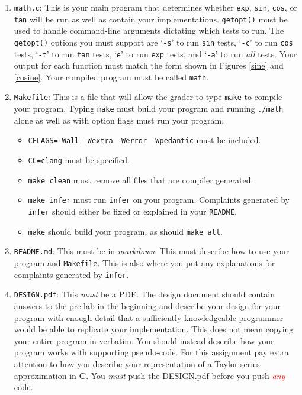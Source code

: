 \documentclass[11pt]{article}
\begin{document}
\begin{enumerate}
  \item \texttt{math.c}: This is your main program that determines whether
      \texttt{exp}, \texttt{sin}, \texttt{cos}, or \texttt{tan} will be run as
      well as contain your implementations. \texttt{getopt()} must be used to
      handle command-line arguments dictating which tests to run.
        The \texttt{getopt()} options you must support are
        `\texttt{-s}' to run \texttt{sin} tests, `\texttt{-c}' to run
        \texttt{cos} tests, `\texttt{-t}' to run \texttt{tan} tests,
        `\texttt{e}' to run \texttt{exp} tests, and `\texttt{-a}' to run
        \emph{all} tests. Your output for each function must match the form
        shown in Figures \ref{sine} and \ref{cosine}.
        Your compiled program must be called \texttt{math}.

  \item \texttt{Makefile}: This is a file that will allow the grader to type
      \texttt{make} to compile your program. Typing \texttt{make} must build
        your program and running \texttt{./math} alone as well as with option flags must run your program.
  \begin{itemize}
    \item \texttt{CFLAGS=-Wall -Wextra -Werror -Wpedantic} must be included.
    \item \texttt{CC=clang} must be specified.
    \item \texttt{make clean} must remove all files that are compiler generated.
    \item \texttt{make infer} must run \texttt{infer} on your program.
        Complaints generated by \texttt{infer} should either be fixed or
        explained in your \texttt{README}.
    \item \texttt{make} should build your program, as should \texttt{make all}.
  \end{itemize}

  \item \texttt{README.md}: This must be in \emph{markdown}. This
      must describe how to use your program and \texttt{Makefile}. This is also
      where you put any explanations for complaints generated by \texttt{infer}.

  \item \texttt{DESIGN.pdf}: This \emph{must} be a PDF. The design document
  should contain answers to the pre-lab in the beginning and describe your design
  for your program with enough detail that a sufficiently knowledgeable programmer
  would be able to replicate your implementation. This does not mean copying your
  entire program in verbatim. You should instead describe how your
  program works with supporting pseudo-code. For this assignment pay extra attention to how
  you describe your representation of a Taylor series approximation in \textbf{C}.
  You \emph{must} push the DESIGN.pdf before you push \textcolor{red}{\emph{any}} code.


\end{enumerate}
\end{document}
